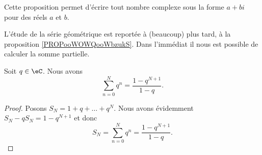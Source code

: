 Cette proposition permet d'écrire tout nombre complexe sous la forme \( a+bi\) pour des réels \( a\) et \( b\). 





L'étude de la série géométrique est reportée à (beaucoup) plus tard, à la proposition \ref{PROPooWOWQooWbzukS}. Dans l'immédiat il nous est possible de calculer la somme partielle.
\begin{lemma}      \label{LEMooAFSCooWEVlvp}
    Soit \( q\in \eC\). Nous avons
    \begin{equation}
        \sum_{n=0}^Nq^n=\frac{ 1-q^{N+1} }{ 1-q }.
    \end{equation}
\end{lemma}

\begin{proof}
    Posons \( S_N=1+q+\ldots+q^N\). Nous avons évidemment $S_N-qS_N=1-q^{N+1}$ et donc
    \begin{equation}    \label{EqASYTiCK}
        S_N=\sum_{n=0}^Nq^n=\frac{ 1-q^{N+1} }{ 1-q }.
    \end{equation}
\end{proof}

